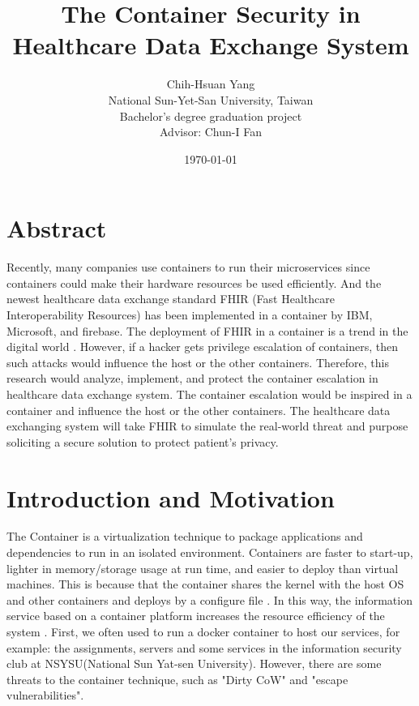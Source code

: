 \documentclass[12pt,a4paper]{article}
\title{{The Container Security in Healthcare Data Exchange System}}
\author{Chih-Hsuan Yang\\
National Sun-Yet-San University, Taiwan \\
Bachelor's degree graduation project \\
Advisor: Chun-I Fan
}
\date{\today}
\begin{document}
\section{Abstract}
Recently, many companies use containers to run their microservices since containers could
make their hardware resources be used efficiently. And the newest healthcare data exchange
standard FHIR (Fast Healthcare Interoperability Resources) \cite{FHIR_home} has been implemented
in a container by IBM, Microsoft, and firebase. The deployment of FHIR in a container is a
trend in the digital world \cite{Infrastructures}. However, if a hacker gets privilege
escalation of containers, then such attacks would influence the host or the other containers.
Therefore, this research would analyze, implement, and protect the container escalation
in healthcare data exchange system. The container escalation would be inspired in a container
and influence the host or the other containers. The healthcare data exchanging system will
take FHIR to simulate the real-world threat and purpose soliciting a secure solution to
protect patient's privacy.


\section{Introduction and Motivation}
The Container is a virtualization technique to package applications and dependencies to run in
an isolated environment. Containers are faster to start-up, lighter in memory/storage usage
at run time, and easier to deploy than virtual machines. This is because that the container
shares the kernel with the host OS and other containers and deploys by a configure file
\cite{Offloading}. In this way, the information service based on a container platform increases
the resource efficiency of the system \cite{Comparison}.
First, we often used to run a docker container to host our services, for example: the assignments,
servers and some services in the information security club at NSYSU(National Sun Yat-sen University).
However, there are some threats to the container technique, such as "Dirty CoW" \cite{Dirty_CoW}
and "escape vulnerabilities".\\
\end{document}
